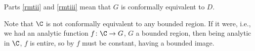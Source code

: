 \begin{remark}
	Parts \ref{rmtii} and \ref{rmtiii} mean that $G$ is conformally equivalent to $D$.
\end{remark}

Note that $\C$ is not conformally equivalent to any bounded region.
If it were, i.e., we had an analytic function $f \colon \C \to G$, $G$ a bounded region, then being analytic in $\C$, $f$ is entire, so by  $f$ must be constant, having a bounded image.
